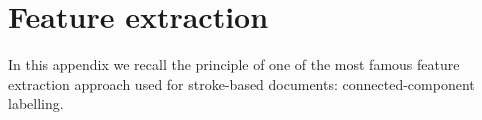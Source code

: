 \chapter{Feature extraction}
\label{app:feature_extraction}
\graphicspath{{./chapters/Appendix/figs/}}

In this appendix we recall the principle of one of the most famous feature extraction approach used for stroke-based documents: connected-component labelling.






  
